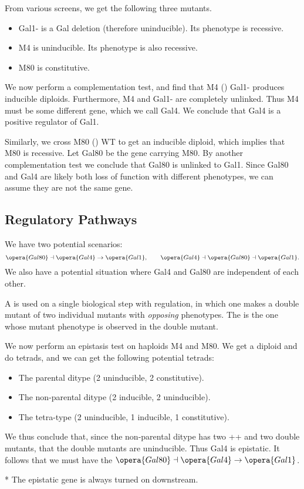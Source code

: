\begin{exper}
	From various screens, we get the following three mutants.
	\begin{itemize}
		\item Gal1- is a Gal deletion (therefore uninducible). Its phenotype is recessive.
		\item M4 is uninducible. Its phenotype is also recessive.
		\item M80 is constitutive.
	\end{itemize}
	We now perform a complementation test, and find that M4 (\x) Gal1- produces inducible diploids. Furthermore, M4 and Gal1- are completely unlinked.
	Thus M4 must be some different gene, which we call Gal4.
	We conclude that Gal4 is a positive regulator of Gal1.

	Similarly, we cross M80 (\x) WT to get an inducible diploid, which implies that M80 is recessive.
	Let Gal80 be the gene carrying M80. By another complementation test we conclude that Gal80 is unlinked to Gal1. 
	Since Gal80 and Gal4 are likely both loss of function with different phenotypes, we can assume they are not the same gene.
\end{exper}

\subsection{Regulatory Pathways}

We have two potential scenarios: \[
	\opera{Gal80} \dashv \opera{Gal4}\to \opera{Gal1}, \qquad \opera{Gal4}\dashv \opera{Gal80}\dashv \opera{Gal1}.
\]
We also have a potential situation where Gal4 and Gal80 are independent of each other.

\begin{defn}
	A  is used on a single biological step with regulation, in which one makes a double mutant of two individual mutants with \emph{opposing} phenotypes.
	The  is the one whose mutant phenotype is observed in the double mutant.
\end{defn}

\begin{exper}
	We now perform an epistasis test on haploids M4 and M80. We get a diploid and do tetrads, and we can get the following potential tetrads:
	\begin{itemize}
		\item The parental ditype (2 uninducible, 2 constitutive).
		\item The non-parental ditype (2 inducible, 2 uninducible).
		\item The tetra-type (2 uninducible, 1 inducible, 1 constitutive).
	\end{itemize}
	We thus conclude that, since the non-parental ditype has two ++ and two double mutants, that the double mutants are uninducible. Thus Gal4 is epistatic.
	It follows that we must have the $\opera{Gal80} \dashv \opera{Gal4} \to \opera{Gal1}$.
\end{exper}

\begin{fact}*
	The epistatic gene is always turned on downstream.
\end{fact}
